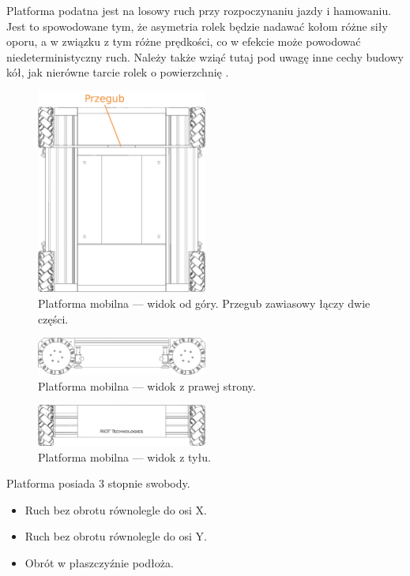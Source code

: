 	Platforma podatna jest na losowy ruch przy rozpoczynaniu jazdy i hamowaniu.
	Jest to spowodowane tym, że asymetria rolek będzie nadawać kołom różne siły oporu, a w związku z tym różne prędkości, co w efekcie może powodować niedeterministyczny ruch.
	Należy także wziąć tutaj pod uwagę inne cechy budowy kół, jak nierówne tarcie rolek o powierzchnię \cite{braking}.

	\begin{figure}[H]
	\centering
	\includegraphics[width=0.5\textwidth]{graphics/base_top.png}
	\caption{Platforma mobilna --- widok od góry. Przegub zawiasowy łączy dwie części.}
	\label{fig:base_top}
	\end{figure} 

	\begin{figure}[H]
	\centering
	\includegraphics[width=0.5\textwidth]{graphics/base_side.pdf}
	\caption{Platforma mobilna --- widok z prawej strony.}
	\label{fig:base_side}
	\end{figure} 

	\begin{figure}[H]
	\centering
	\includegraphics[width=0.5\textwidth]{graphics/base_front.pdf}
	\caption{Platforma mobilna --- widok z tyłu.}
	\label{fig:base_front}
	\end{figure} 

	Platforma posiada 3 stopnie swobody. 
	\begin{itemize}
		\item Ruch bez obrotu równolegle do osi X.
		\item Ruch bez obrotu równolegle do osi Y.
		\item Obrót w płaszczyźnie podłoża.
	\end{itemize}


